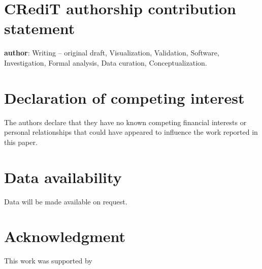 \documentclass[12pt]{article}
\begin{document}
\section*{CRediT authorship contribution statement}
\textbf{author}: Writing – original draft, Visualization, Validation, Software, Investigation, Formal analysis, Data curation, Conceptualization. 

\section*{Declaration of competing interest}
The authors declare that they have no known competing financial interests or personal relationships that could have appeared to influence the work reported in this paper.

\section*{Data availability}
Data will be made available on request.

\section*{Acknowledgment}
This work was supported by \citep{blok_highthroughput_2025}



\end{document}
